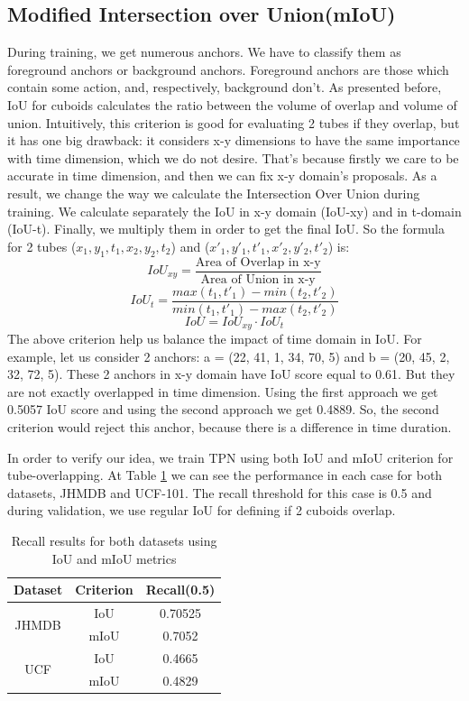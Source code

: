 \subsection{Modified Intersection over Union(mIoU)} 
During training, we get numerous anchors. We have to classify them as foreground anchors or
background anchors. Foreground anchors are those which contain some action, and, respectively, background
don't. As presented before, IoU for cuboids calculates the ratio between the volume of overlap and volume of
union.
Intuitively, this criterion is good for evaluating 2 tubes if they overlap, but it has one big drawback:
it considers x-y dimensions to have the same importance with time dimension, which we do not desire. That's because
firstly we care to be accurate in time dimension, and then we can fix x-y domain's proposals.
As a result, we change the way we calculate the Intersection Over Union during training. We calculate separately
the IoU in x-y domain (IoU-xy) and in t-domain (IoU-t). Finally, we multiply them in order to get the final IoU.
So the formula for 2 tubes ($x_1, y_1, t_1, x_2, y_2, t_2$) and ($x'_1, y'_1, t'_1, x'_2, y'_2, t'_2$) is:
\[ IoU_{xy} = \frac{ \text{Area of Overlap in x-y}} { \text{Area of Union in x-y}}  \]
\[ IoU_t = \frac { max(t_1, t'_1) - min(t_2, t'_2)} {min(t_1,t'_1) - max(t_2,t'_2)} \]
\[ IoU = IoU_{xy} \cdot  IoU_t \]
The above criterion help us balance the impact of time domain in IoU. For example, let us consider 2 anchors:
a = (22, 41, 1, 34, 70, 5) and b = (20, 45, 2, 32, 72, 5). These 2 anchors in x-y domain have IoU score equal to 0.61.
But they are not exactly overlapped in time dimension. Using the first approach we get 0.5057 IoU score and using the
second approach we get 0.4889. So, the second criterion would reject this anchor, because there is a difference in time
duration.  \par

In order to verify our idea, we train TPN using both IoU and mIoU criterion for tube-overlapping. At Table \ref{table:iou_miou}
we can see the performance in each case for both datasets, JHMDB and UCF-101. The recall threshold for this case is 0.5 and during validation,
we use regular IoU for defining if 2 cuboids overlap.
\begin{table}[h]
\centering
  \begin{tabular}{|| c | c || c ||}
    \hline
    \textbf{Dataset} & \textbf{Criterion} & \textbf{Recall(0.5)} \\
    \hline  \hline
    \multirow{2}{4em}{JHMDB} & IoU & 0.70525 \\
    \cline{2-3}
    {} & mIoU & 0.7052 \\
    \hline
    \multirow{2}{4em}{UCF} & IoU & 0.4665 \\
    \cline{2-3}
    {} & mIoU & 0.4829 \\
    \hline      
  \end{tabular}
  \caption{Recall results for both datasets using IoU and mIoU metrics}
  \label{table:iou_miou}
\end{table}

